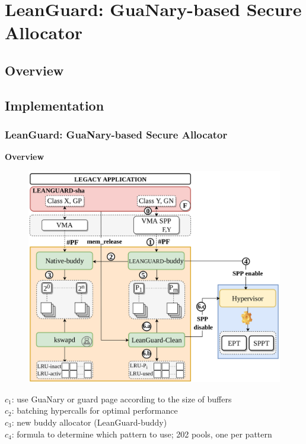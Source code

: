 \documentclass[xcolor=table,bigger,unknownkeysallowed]{beamer}
\begin{document}
\section{LeanGuard: GuaNary-based Secure Allocator}
\subsection{Overview}
\subsection{Implementation}
\begin{frame}
	\frametitle{LeanGuard: GuaNary-based Secure Allocator} 
	\textbf{Overview}\\
	\vspace*{.5cm}
	\begin{minipage}{.48\linewidth}
		\begin{figure}
			\centering
			\includegraphics[width=.9\columnwidth]{fig/leanguard.png}
		\end{figure}			
	\end{minipage}
	\begin{minipage}{.48\linewidth}
		$c_1$: use GuaNary or guard page according to the size of buffers\\
		\pause
		$c_2$: batching	hypercalls for optimal performance\\
		$c_3$: new buddy allocator (LeanGuard-buddy)\\
		\pause
		$c_4$: formula to determine which pattern to use; 202 pools, one per pattern
	\end{minipage}	
\end{frame}               
\end{document}
